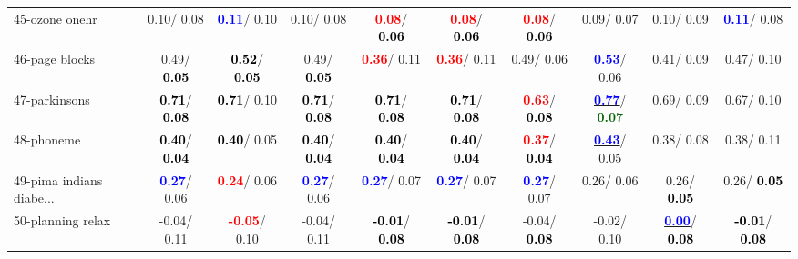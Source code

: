 \begin{table}[h]
\begin{center}
{\begin{tabular}{lc|c|c|c|c|c|c|c|c}
45-ozone onehr &   0.10/  0.08 & \textcolor{blue}{\textbf{  0.11}}/  0.10 &   0.10/  0.08 & \textcolor{red}{\textbf{  0.08}}/\textcolor{black}{\textbf{  0.06}} & \textcolor{red}{\textbf{  0.08}}/\textcolor{black}{\textbf{  0.06}} & \textcolor{red}{\textbf{  0.08}}/\textcolor{black}{\textbf{  0.06}} &   0.09/  0.07 &   0.10/  0.09 & \textcolor{blue}{\textbf{  0.11}}/  0.08 \\
46-page blocks &   0.49/\textcolor{black}{\textbf{  0.05}} & \textcolor{black}{\textbf{  0.52}}/\textcolor{black}{\textbf{  0.05}} &   0.49/\textcolor{black}{\textbf{  0.05}} & \textcolor{red}{\textbf{  0.36}}/  0.11 & \textcolor{red}{\textbf{  0.36}}/  0.11 &   0.49/  0.06 & \underline{\textcolor{blue}{\textbf{  0.53}}}/  0.06 &   0.41/  0.09 &   0.47/  0.10 \\ \hline
47-parkinsons & \textcolor{black}{\textbf{  0.71}}/\textcolor{black}{\textbf{  0.08}} & \textcolor{black}{\textbf{  0.71}}/  0.10 & \textcolor{black}{\textbf{  0.71}}/\textcolor{black}{\textbf{  0.08}} & \textcolor{black}{\textbf{  0.71}}/\textcolor{black}{\textbf{  0.08}} & \textcolor{black}{\textbf{  0.71}}/\textcolor{black}{\textbf{  0.08}} & \textcolor{red}{\textbf{  0.63}}/\textcolor{black}{\textbf{  0.08}} & \underline{\textcolor{blue}{\textbf{  0.77}}}/\textcolor{darkgreen}{\textbf{  0.07}} &   0.69/  0.09 &   0.67/  0.10 \\
48-phoneme & \textcolor{black}{\textbf{  0.40}}/\textcolor{black}{\textbf{  0.04}} & \textcolor{black}{\textbf{  0.40}}/  0.05 & \textcolor{black}{\textbf{  0.40}}/\textcolor{black}{\textbf{  0.04}} & \textcolor{black}{\textbf{  0.40}}/\textcolor{black}{\textbf{  0.04}} & \textcolor{black}{\textbf{  0.40}}/\textcolor{black}{\textbf{  0.04}} & \textcolor{red}{\textbf{  0.37}}/\textcolor{black}{\textbf{  0.04}} & \underline{\textcolor{blue}{\textbf{  0.43}}}/  0.05 &   0.38/  0.08 &   0.38/  0.11 \\
49-pima indians diabe... & \textcolor{blue}{\textbf{  0.27}}/  0.06 & \textcolor{red}{\textbf{  0.24}}/  0.06 & \textcolor{blue}{\textbf{  0.27}}/  0.06 & \textcolor{blue}{\textbf{  0.27}}/  0.07 & \textcolor{blue}{\textbf{  0.27}}/  0.07 & \textcolor{blue}{\textbf{  0.27}}/  0.07 &   0.26/  0.06 &   0.26/\textcolor{black}{\textbf{  0.05}} &   0.26/\textcolor{black}{\textbf{  0.05}} \\
50-planning relax &  -0.04/  0.11 & \textcolor{red}{\textbf{ -0.05}}/  0.10 &  -0.04/  0.11 & \textcolor{black}{\textbf{ -0.01}}/\textcolor{black}{\textbf{  0.08}} & \textcolor{black}{\textbf{ -0.01}}/\textcolor{black}{\textbf{  0.08}} &  -0.04/\textcolor{black}{\textbf{  0.08}} &  -0.02/  0.10 & \underline{\textcolor{blue}{\textbf{  0.00}}}/\textcolor{black}{\textbf{  0.08}} & \textcolor{black}{\textbf{ -0.01}}/\textcolor{black}{\textbf{  0.08}} \\

\end{tabular}}
\end{center}
\end{table}
